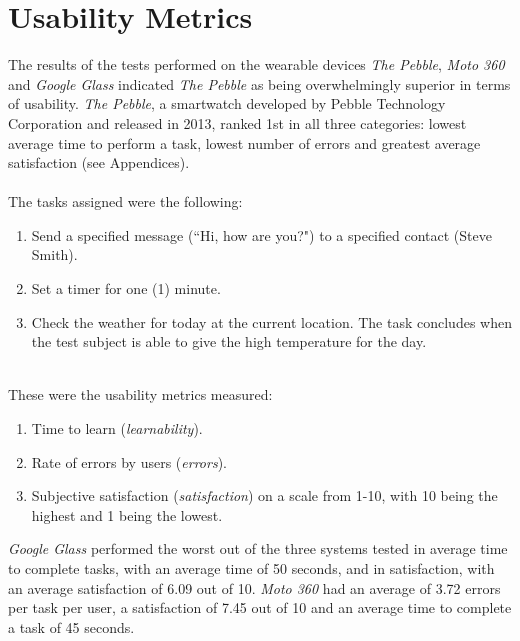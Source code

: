 \documentclass[11pt,a4paper]{scrartcl}
\begin{document}
\section{Usability Metrics}
The results of the tests performed on the wearable devices \textit{The Pebble}, \textit{Moto 360} and \textit{Google Glass} indicated \textit{The Pebble} as being overwhelmingly superior in terms of usability. \textit{The Pebble}, a smartwatch developed by Pebble Technology Corporation and released in 2013, ranked 1st in all three categories: lowest average time to perform a task, lowest number of errors and greatest average satisfaction (see Appendices).\\
\hspace*{\fill} \\
The tasks assigned were the following:
\begin{enumerate}
	\item Send a specified message (``Hi, how are you?") to a specified contact (Steve Smith). 
	\item Set a timer for one (1) minute.
	\item Check the weather for today at the current location. The task concludes when the test subject is able to give the high temperature for the day.
\end{enumerate}
\hspace*{\fill} \\
These were the usability metrics measured:
\begin{enumerate}
	\item Time to learn (\textit{learnability}).
	\item Rate of errors by users (\textit{errors}).
	\item Subjective satisfaction (\textit{satisfaction}) on a scale from 1-10, with 10 being the highest and 1 being the lowest.
\end{enumerate}
\textit{Google Glass} performed the worst out of the three systems tested in average time to complete tasks, with an average time of 50 seconds, and in satisfaction, with an average satisfaction of 6.09 out of 10. \textit{Moto 360} had an average of 3.72 errors per task per user, a satisfaction of 7.45 out of 10 and an average time to complete a task of 45 seconds.

\end{document}
